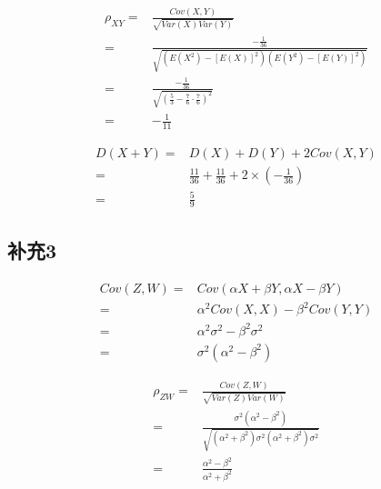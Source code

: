 \documentclass[a4paper,12pt]{ctexart}
\begin{document}
\begin{align*}
	\rho_{XY} =& \frac{Cov(X,Y)}{\sqrt{Var(X)Var(Y)}} \\
			  =& \frac{- \frac{1}{36}}{\sqrt{(E(X^2) - [E(X)]^2)(E(Y^2) - [E(Y)]^2)}} \\
			  =& \frac{- \frac{1}{36}}{\sqrt{(\frac{5}{3} - \frac{7}{6} \cdot \frac{7}{6})^2}} \\
			  =& - \frac{1}{11}
\end{align*}

\begin{align*}
	D(X+Y) =& D(X) + D(Y) + 2Cov(X,Y) \\
		   =& \frac{11}{36} + \frac{11}{36} + 2 \times (- \frac{1}{36}) \\
		   =& \frac{5}{9} 
\end{align*}

\subsection*{补充3}

\begin{align*}
	Cov(Z,W) =& Cov(\alpha X + \beta Y, \alpha X - \beta Y) \\
			 =& \alpha^2 Cov(X,X) - \beta^2 Cov(Y,Y) \\
			 =& \alpha^2 \sigma^2 - \beta^2 \sigma^2 \\
			 =& \sigma^2 (\alpha^2 - \beta^2)
\end{align*}

\begin{align*}
	\rho_{ZW} =& \frac{Cov(Z,W)}{\sqrt{Var(Z)Var(W)}} \\
			  =& \frac{\sigma^2 (\alpha^2 - \beta^2)}{\sqrt{(\alpha^2 + \beta^2) \sigma^2 (\alpha^2 + \beta^2) \sigma^2}} \\
			  =& \frac{\alpha^2 - \beta^2}{\alpha^2 + \beta^2}
\end{align*}
\end{document}
